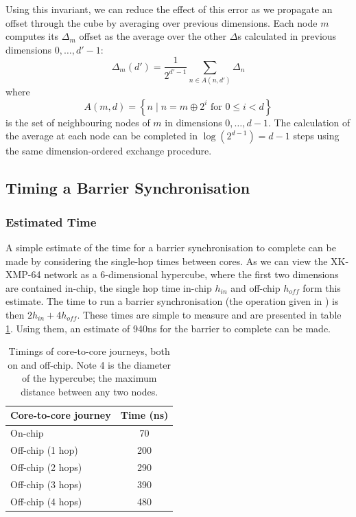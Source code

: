 Using this invariant, we can reduce the effect of this error as we propagate an
offset through the cube by averaging over previous dimensions. Each node 
$m$ computes its $\Delta_m$ offset as the average over the other $\Delta$s
calculated in previous dimensions $0,\dots,d'-1$: 
$$\Delta_{m}(d') = \frac{1}{2^{d'-1}} \sum_ {n \in A(n,d')} \Delta_{n}$$ 
where 
$$A(m,d) = \left\{n \mid n=m\oplus 2^i \text{ for } 0 \leq i < d\right\}$$ 
is the set of neighbouring nodes of $m$ in dimensions $0, \dots,d-1$.
The calculation of the average at each node can be completed in $\log(2^{d-1}) =
d-1$ steps using the same dimension-ordered exchange procedure. 

\subsection{Timing a Barrier Synchronisation}

\subsubsection{Estimated Time}

A simple estimate of the time for a barrier synchronisation to complete can be
made by considering the single-hop times between cores.  As we can view the
XK-XMP-64 network as a $6$-dimensional hypercube, where the first two dimensions
are contained in-chip, the single hop time in-chip $h_{in}$ and off-chip
$h_{off}$ form this estimate. The time to run a barrier synchronisation (the
operation given in ) is then $2 h_{in} + 4 h_{off}$. These times
are simple to measure and are presented in table \ref{tab:hoptimes}. Using them,
an estimate of 940ns for the barrier to complete can be made.

\begin{table}
\centering
\begin{tabular}{lc}
{\bf Core-to-core journey} & {\bf Time (ns)}\\
\hline
On-chip & 70\\
Off-chip (1 hop) & 200\\
Off-chip (2 hops) & 290\\
Off-chip (3 hops) & 390\\
Off-chip (4 hops) & 480\\
\end{tabular}
\caption{Timings of core-to-core journeys, both on and off-chip. Note 4 is the
diameter of the hypercube; the maximum distance between any two nodes.}
\label{tab:hoptimes}
\end{table}

